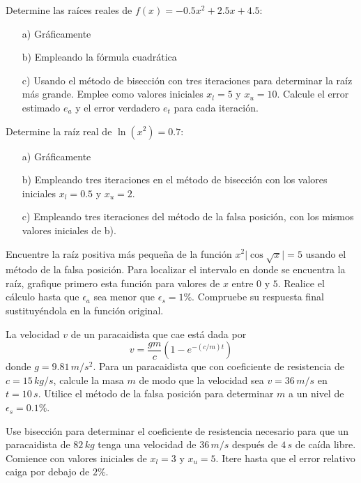 \documentclass[12pt,letterpaper]{article}
\providecommand{\mypar}[1]{\left( #1 \right) }
\theoremstyle{definition}
\theoremstyle{plain}
\theoremstyle{remark}
\begin{document}
\begin{multicols}{2}
{\problem Determine las raíces reales de $f(x) = -0.5x^2 + 2.5x + 4.5$:\begin{itemize}
\item[a)] Gráficamente
\item[b)] Empleando la fórmula cuadrática
\item[c)] Usando el método de bisección con tres iteraciones para determinar la raíz más grande. Emplee como valores iniciales $x_l = 5$ y $x_u = 10$. Calcule el error estimado $e_a$ y el error verdadero $e_t$ para cada iteración.\end{itemize}}

{\problem Determine la raíz real de $\ln{(x^2)}=0.7$:\begin{itemize}
\item[a)] Gráficamente
\item[b)] Empleando tres iteraciones en el método de bisección con los valores iniciales $x_l = 0.5$ y $x_u = 2$.
\item[c)] Empleando tres iteraciones del método de la falsa posición, con los mismos valores iniciales de b).
\end{itemize}}

{\problem Encuentre la raíz positiva más pequeña de la función $x^2|\cos{\sqrt{x}|}=5$ usando el método de la falsa posición. Para localizar el intervalo en donde se encuentra la raíz, grafique primero esta función para valores de $x$ entre $0$ y $5$. Realice el cálculo hasta que $\epsilon_a$ sea menor que $\epsilon_s=1\%$. Compruebe su respuesta final sustituyéndola en la función original.}

{\problem La velocidad $v$ de un paracaidista que cae está dada por $$v=\frac{gm}{c}\mypar{1-e^{-(c/m)t}}$$ donde $g=9.81\,m/s^2$. Para un paracaidista que con coeficiente de resistencia de $c=15\,kg/s$, calcule la masa $m$ de modo que la velocidad sea $v=36\, m/s$ en $t=10\,s$. Utilice el método de la falsa posición para determinar $m$ a un nivel de $\epsilon_s=0.1\%$.}

{\problem Use bisección para determinar el coeficiente de resistencia necesario para que un paracaidista de $82\,kg$ tenga una velocidad de $36\,m/s$ después de $4\,s$ de caída libre. Comience con valores iniciales de $x_l=3$ y $x_u=5$. Itere hasta que el error relativo caiga por debajo de $2\%$.}


\end{multicols}
\end{document}
